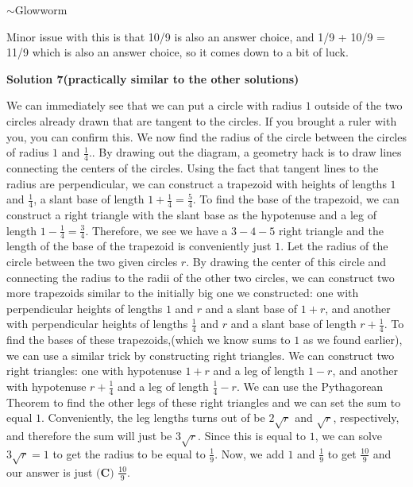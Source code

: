 \begin{enumerate}
 $\sim$Glowworm

 Minor issue with this is that 10/9 is also an answer choice, and 1/9 + 10/9 = 11/9 which is also an answer choice, so it comes down to a bit of luck.

 



\textbf{Solution 7(practically similar to the other solutions)}

We can immediately see that we can put a circle with radius $1$ outside of the two circles already drawn that are tangent to the circles. If you brought a ruler with you, you can confirm this. We now find the radius of the circle between the circles of radius $1$ and $\frac{1}{4}$.. By drawing out the diagram, a geometry hack is to draw lines connecting the centers of the circles. Using the fact that tangent lines to the radius are perpendicular, we can construct a trapezoid with heights of lengths $1$ and $\frac{1}{4}$, a slant base of length $1 + \frac{1}{4} = \frac{5}{4}$. To find the base of the trapezoid, we can construct a right triangle with the slant base as the hypotenuse and a leg of length $1 - \frac{1}{4} = \frac{3}{4}$. Therefore, we see we have a $3-4-5$ right triangle and the length of the base of the trapezoid is conveniently just $1$. Let the radius of the circle between the two given circles $r$. By drawing the center of this circle and connecting the radius to the radii of the other two circles, we can construct two more trapezoids similar to the initially big one we constructed: one with perpendicular heights of lengths $1$ and $r$ and a slant base of $1 + r$, and another with perpendicular heights of lengths $\frac{1}{4}$ and $r$ and a slant base of length $r + \frac{1}{4}$. To find the bases of these trapezoids,(which we know sums to $1$ as we found earlier), we can use a similar trick by constructing right triangles. We can construct two right triangles: one with hypotenuse $1 + r$ and a leg of length $1 - r$, and another with hypotenuse $r + \frac{1}{4}$ and a leg of length $\frac{1}{4} - r$. We can use the Pythagorean Theorem to find the other legs of these right triangles and we can set the sum to equal $1$. Conveniently, the leg lengths turns out of be $2\sqrt{r}$ and $\sqrt{r}$, respectively, and therefore the sum will just be $3\sqrt{r}$. Since this is equal to $1$, we can solve $3\sqrt{r} = 1$ to get the radius to be equal to $\frac{1}{9}$. Now, we add $1$ and $\frac{1}{9}$ to get $\frac{10}{9}$ and our answer is just $\boxed{\textbf{(C) }\frac{10}{9}}$.


\end{enumerate}
